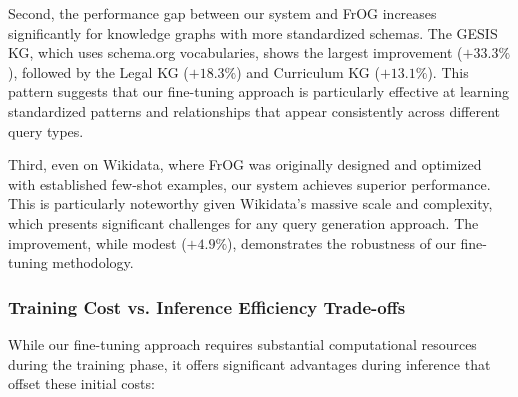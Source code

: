 Second, the performance gap between our system and FrOG increases significantly for knowledge graphs with more standardized schemas. The GESIS KG, which uses schema.org vocabularies, shows the largest improvement ($+33.3\%$), followed by the Legal KG ($+18.3\%$) and Curriculum KG ($+13.1\%$). This pattern suggests that our fine-tuning approach is particularly effective at learning standardized patterns and relationships that appear consistently across different query types.

Third, even on Wikidata, where FrOG was originally designed and optimized with established few-shot examples, our system achieves superior performance. This is particularly noteworthy given Wikidata's massive scale and complexity, which presents significant challenges for any query generation approach. The improvement, while modest ($+4.9\%$), demonstrates the robustness of our fine-tuning methodology.

\subsubsection{Training Cost vs. Inference Efficiency Trade-offs}
While our fine-tuning approach requires substantial computational resources during the training phase, it offers significant advantages during inference that offset these initial costs:

